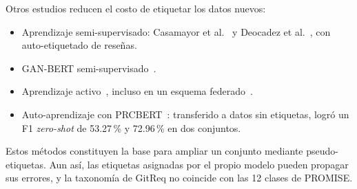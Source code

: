 \documentclass[conference]{IEEEtran}
\begin{document}
Otros estudios reducen el costo de etiquetar los datos nuevos:
\begin{itemize}
  \item Aprendizaje semi-supervisado: Casamayor et al.~\cite{Casamayor2010-SemiSupervised} y Deocadez et al.~\cite{Deocadez2017-Automatically}, con auto-etiquetado de reseñas.
  \item GAN-BERT semi-supervisado~\cite{Airlangga2024-Enhancing}.
  \item Aprendizaje activo~\cite{Magalhaes2021-MAREActive,Zhang2022-Reducing}, incluso en un esquema federado~\cite{Alhoshan2026-SeqFAL}.
  \item Auto-aprendizaje con PRCBERT~\cite{Luo2022-PRCBERT}: transferido a datos sin etiquetas, logró un F1 \emph{zero-shot} de 53.27\,\% y 72.96\,\% en dos conjuntos.
\end{itemize}
Estos métodos constituyen la base para ampliar un conjunto mediante pseudo-etiquetas. Aun así, las etiquetas asignadas por el propio modelo pueden propagar sus errores, y la taxonomía de GitReq no coincide con las 12 clases de PROMISE.
\end{document}
